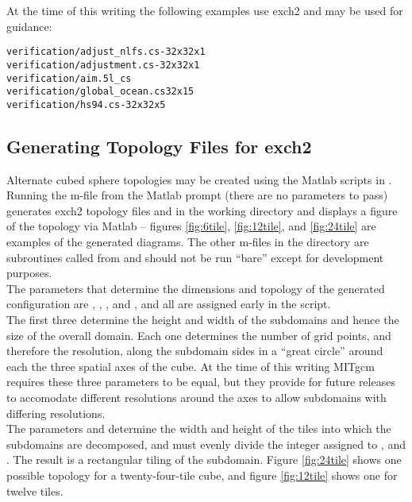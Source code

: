 At the time of this writing the following examples use exch2 and may
be used for guidance:

\begin{verbatim}
verification/adjust_nlfs.cs-32x32x1
verification/adjustment.cs-32x32x1 
verification/aim.5l_cs
verification/global_ocean.cs32x15
verification/hs94.cs-32x32x5
\end{verbatim}




\subsection{Generating Topology Files for exch2}
\label{sec:topogen}

Alternate cubed sphere topologies may be created using the Matlab
scripts in . Running the
m-file
from the Matlab prompt (there are no parameters to pass) generates
exch2 topology files  and
 in the working directory and displays a figure of
the topology via Matlab -- figures \ref{fig:6tile}, \ref{fig:12tile}, 
and \ref{fig:24tile} are examples of the generated diagrams.  The other 
m-files in the directory are
subroutines called from  and should not be run ``bare'' except
for development purposes. \\

The parameters that determine the dimensions and topology of the
generated configuration are , , ,
 and , and all are assigned early in the script. \\

The first three determine the height and width of the subdomains and
hence the size of the overall domain.  Each one determines the number
of grid points, and therefore the resolution, along the subdomain
sides in a ``great circle'' around each the three spatial axes of the cube.  At the time
of this writing MITgcm requires these three parameters to be equal,
but they provide for future releases  to accomodate different
resolutions around the axes to allow subdomains with differing resolutions.\\

The parameters  and  determine the width and height of
the tiles into which the subdomains are decomposed, and must evenly
divide the integer assigned to ,  and .
The result is a rectangular tiling of the subdomain.  Figure
\ref{fig:24tile} shows one possible topology for a twenty-four-tile
cube, and figure \ref{fig:12tile} shows one for twelve tiles. \\

